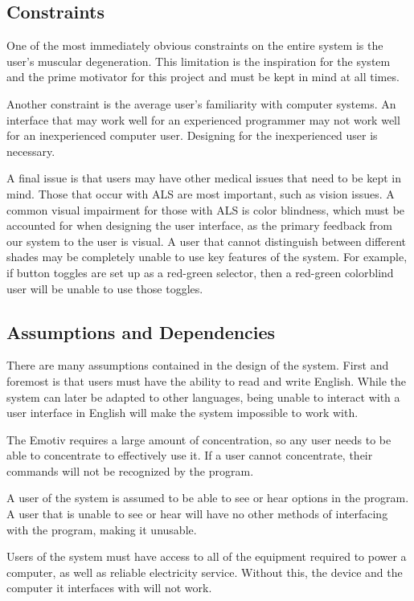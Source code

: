 \documentclass{article}
\begin{document}

\subsection{Constraints}

One of the most immediately obvious constraints on the entire system is the
user's muscular degeneration. This limitation is the inspiration for the
system and the prime motivator for this project and must be kept in mind at
all times.

Another constraint is the average user's familiarity with computer systems. An
interface that may work well for an experienced programmer may not work well
for an inexperienced computer user. Designing for the inexperienced user is
necessary.

A final issue is that users may have other medical issues that need to be
kept in mind. Those that occur with ALS are most important, such as vision
issues. A common visual impairment for those with ALS is color blindness,
which must be accounted for when designing the user interface, as the
primary feedback from our system to the user is visual. A user that cannot
distinguish between different shades may be completely unable to use key
features of the system. For example, if button toggles are set up as a
red-green selector, then a red-green colorblind user will be unable to use
those toggles.

\subsection{Assumptions and Dependencies}

There are many assumptions contained in the design of the system. First and
foremost is that users must have the ability to read and write English.
While the system can later be adapted to other languages, being unable to
interact with a user interface in English will make the system impossible to
work with.

The Emotiv requires a large amount of concentration, so any user needs to be
able to concentrate to effectively use it. If a user cannot concentrate,
their commands will not be recognized by the program.

A user of the system is assumed to be able to see or hear options in the
program. A user that is unable to see or hear will have no other methods of
interfacing with the program, making it unusable.

Users of the system must have access to all of the equipment required to
power a computer, as well as reliable electricity service. Without this, the
device and the computer it interfaces with will not work.
\end{document}
